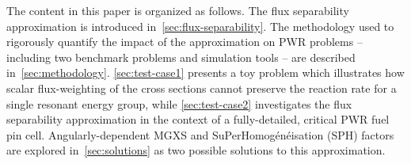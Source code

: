 The content in this paper is organized as follows. The flux separability approximation is introduced in~\autoref{sec:flux-separability}. The methodology used to rigorously quantify the impact of the approximation on PWR problems -- including two benchmark problems and simulation tools -- are described in~\autoref{sec:methodology}. \autoref{sec:test-case1} presents a toy problem which illustrates how scalar flux-weighting of the cross sections cannot preserve the reaction rate for a single resonant energy group, while \autoref{sec:test-case2} investigates the flux separability approximation in the context of a fully-detailed, critical PWR fuel pin cell. Angularly-dependent MGXS and SuPerHomog\'{e}n\'{e}isation (SPH) factors are explored in~\autoref{sec:solutions} as two possible solutions to this approximation.

